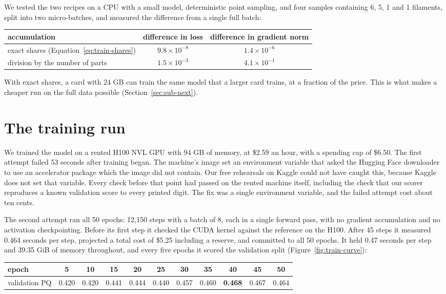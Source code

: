 We tested the two recipes on a CPU with a small model, deterministic point sampling, and four samples
containing 6, 5, 1 and 1 filaments, split into two micro-batches, and measured the difference from a
single full batch:
\begin{center}\small
\begin{tabular}{@{}lcc@{}}
\toprule
accumulation & difference in loss & difference in gradient norm \\
\midrule
exact shares (Equation~\ref{eq:train-shares}) & $9.8\times10^{-8}$ & $1.4\times10^{-6}$ \\
division by the number of parts & $1.5\times10^{-3}$ & $4.1\times10^{-1}$ \\
\bottomrule
\end{tabular}
\end{center}
With exact shares, a card with 24 GB can train the same model that a larger card trains, at a fraction
of the price. This is what makes a cheaper run on the full data possible (Section~\ref{sec:sub-next}).

\section{The training run}\label{sec:train-run}
We trained the model on a rented H100 NVL GPU with 94 GB of memory, at \$2.59 an hour, with a spending
cap of \$6.50. The first attempt failed 53 seconds after training began. The machine's image set an
environment variable that asked the Hugging Face downloader to use an accelerator package which the
image did not contain. Our free rehearsals on Kaggle could not have caught this, because Kaggle does not
set that variable. Every check before that point had passed on the rented machine itself, including the
check that our scorer reproduces a known validation score to every printed digit. The fix was a single
environment variable, and the failed attempt cost about ten cents.

The second attempt ran all 50 epochs: 12,150 steps with a batch of 8, each in a single forward pass,
with no gradient accumulation and no activation checkpointing. Before its first step it checked the
CUDA kernel against the reference on the H100. After 45 steps it measured 0.464 seconds per step,
projected a total cost of \$5.25 including a reserve, and committed to all 50 epochs. It held 0.47
seconds per step and 39.35 GiB of memory throughout, and every five epochs it scored the validation
split (Figure~\ref{fig:train-curve}):
\begin{center}\footnotesize
\setlength{\tabcolsep}{3.5pt}
\begin{tabular}{@{}lcccccccccc@{}}
\toprule
epoch & 5 & 10 & 15 & 20 & 25 & 30 & 35 & 40 & 45 & 50 \\
\midrule
validation PQ & 0.420 & 0.420 & 0.441 & 0.444 & 0.440 & 0.457 & 0.460 & \textbf{0.468} & 0.467 & 0.464 \\
\bottomrule
\end{tabular}
\end{center}

